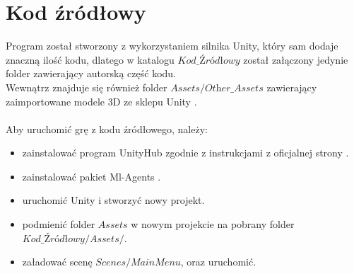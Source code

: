 \section{Kod źródłowy}
    Program został stworzony z wykorzystaniem silnika Unity, który sam dodaje znaczną ilość kodu, 
    dlatego w katalogu $\textit{Kod\_Źródłowy}$ został załączony jedynie folder zawierający autorską część kodu. \\
    Wewnątrz znajduje się również folder $\textit{Assets/Other\_Assets}$ zawierający zaimportowane modele 3D 
    ze sklepu Unity \cite{UnityAssetStore}.\\
    \vspace{2cm}\\
    Aby uruchomić grę z kodu źródłowego, należy:
    \begin{itemize}
        \item zainstalować program UnityHub zgodnie z instrukcjami z oficjalnej strony \cite{UnityInstallation}.
        \item zainstalować pakiet Ml-Agents \cite{UnityMlAgentsInstallation}.
        \item uruchomić Unity i stworzyć nowy projekt.
        \item podmienić folder $Assets$ w nowym projekcie na pobrany folder $\textit{Kod\_Źródłowy/Assets/}$.
        \item załadować scenę $Scenes/MainMenu$, oraz uruchomić.
    \end{itemize}

